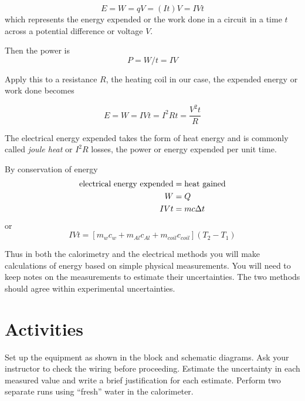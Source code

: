\begin{equation}\label{e:iheat} E = W = qV = (It)V = IVt\end{equation}
which represents the energy expended or the work done in a circuit in a time  $t$ across a potential difference or voltage $V$.	


Then the power is 
\begin{equation}\label{e:power} P = W/t = IV \end{equation}

Apply this to a resistance $R$, the heating coil in our case, the expended energy or work done becomes

\begin{equation}\label{e:eWork} 
E = W = IVt = I^2Rt = \frac{V^2t}{R} 
\end{equation}

The electrical energy expended takes the form of heat energy and is commonly called \textsl{joule heat} or \textsl{$I^2 R$} losses, the power or energy expended per unit time.

By conservation of energy
\begin{align} 
\text{electrical energy expended} & = \text{heat gained} \notag \\
W & = Q \notag \\
IVt & = mc\Delta t \notag
\end{align}
or
\begin{equation}
IVt = [m_wc_w + m_{Al}c_{Al} + m_{coil}c_{coil}](T_2 - T_1)
\end{equation}

Thus in both the calorimetry and the electrical methods you will make calculations of energy based on simple physical measurements.  You will need to keep notes on the measurements to estimate their uncertainties.  The two methods should agree within experimental uncertainties.

\section{Activities}
Set up the equipment as shown in the block and schematic diagrams.  Ask your instructor to check the wiring before proceeding.  Estimate the uncertainty in each measured value and write a brief justification for each estimate. Perform two separate runs using ``fresh'' water in the calorimeter.

